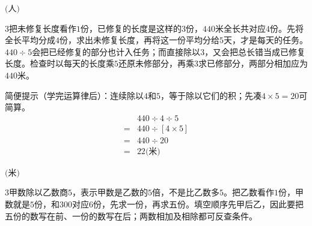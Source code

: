 \documentclass[multi=snippet,border={5bp 20bp 5bp 5bp}]{standalone}
\newenvironment{snippet}[3]{\begin{minipage}{#1bp}\color{answerred}\fontsize{#2}{#3}\selectfont\raggedright}{\end{minipage}}
\begin{document}
\begin{snippet}{80}{10.0}{14}\SourceSans\setlength{\mathindent}{2bp}\(\text{(人)}\)\end{snippet}
\begin{snippet}{505}{11.5}{14}\begin{multicols}{3}\raggedcolumns 把未修复长度看作\(1\)\allowbreak 份，已修复的长度是这样的\(3\)\allowbreak 份，\(440\)\allowbreak 米全长共对应\(4\)\allowbreak 份。先将全长平均分成\(4\)\allowbreak 份，求出未修复长度，再将这一份平均分给\(5\)\allowbreak 天，才是每天的任务。\(440\div5\)\allowbreak 会把已经修复的部分也计入任务；而直接除以\(3\)\allowbreak ，又会把总长错当成已修复长度。检查时以每天的长度乘\(5\)\allowbreak 还原未修部分，再乘\(3\)\allowbreak 求已修部分，两部分相加应为\(440\)\allowbreak 米。\par 简便提示（学完运算律后）：连续除以\(4\)\allowbreak 和\(5\)\allowbreak ，等于除以它们的积；先凑\(4\times5=20\)\allowbreak 可简算。\[\begin{aligned}&440\div4\div5\\={}&440\div[4\times5]\\={}&440\div20\\={}&22\text{(米)}\end{aligned}\]\end{multicols}\end{snippet}
\begin{snippet}{80}{10.0}{14}\SourceSans\setlength{\mathindent}{2bp}\(\text{(米)}\)\end{snippet}
\begin{snippet}{505}{11.5}{14}\begin{multicols}{3}\raggedcolumns 甲数除以乙数商\(5\)\allowbreak ，表示甲数是乙数的\(5\)\allowbreak 倍，不是比乙数多\(5\)\allowbreak 。把乙数看作\(1\)\allowbreak 份，甲数就是\(5\)\allowbreak 份，和\(300\)\allowbreak 对应\(6\)\allowbreak 份，先求一份，再求五份。填空顺序先甲后乙，因此要把五份的数写在前、一份的数写在后；两数相加及相除都可反查条件。\end{multicols}\end{snippet}
\end{document}
